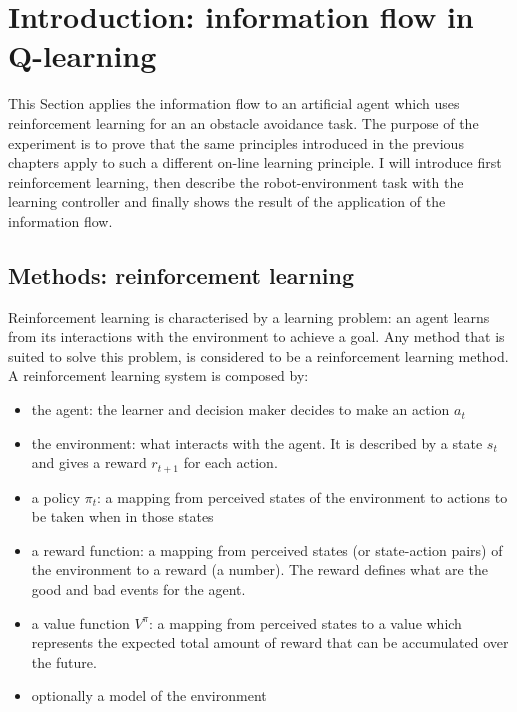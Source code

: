 \section{Introduction: information flow in Q-learning}
\label{Chapter7:Q learning application}
This Section applies the information flow to an artificial agent
which uses reinforcement learning for an an obstacle avoidance task.
The purpose of the experiment is to prove that the same principles introduced
in the previous chapters apply to such a different on-line learning principle.
I will introduce first reinforcement learning, then describe the
robot-environment task with the learning controller and finally shows the
result of the application of the information flow.

\subsection{Methods: reinforcement learning }

Reinforcement learning \citep{TD} is characterised by a learning problem: an agent
learns from its interactions with the environment to achieve a goal.
Any method that is suited to solve this problem, is considered to be
a reinforcement learning method.
A reinforcement learning system is composed by:
\begin{itemize}
 \item the agent: the learner and decision maker decides to make an action $a_t$
 \item the environment: what interacts with the agent. It is described by a
state $s_t$ and gives a reward $r_{t+1}$ for each action.
 \item a policy $\pi_t$: a mapping from perceived states of the environment to
actions to be taken when in those states
 \item a reward function: a mapping from perceived states (or state-action pairs)
of the environment to a reward (a number).
The reward defines what are the good and bad events for the agent.
 \item a value function $V^{\pi}$: a mapping from perceived states to a value
which represents the expected total amount of reward that can be accumulated
over the future.
 \item optionally a model of the environment
\end{itemize}


